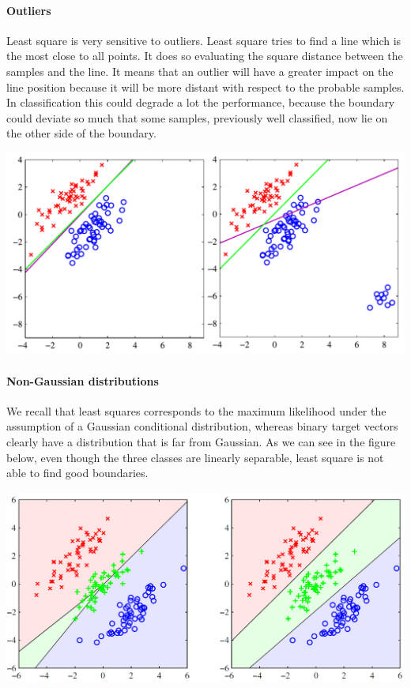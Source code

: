 \documentclass[main.tex]{subfiles}
\begin{document}
\paragraph{Outliers} Least square is very sensitive to outliers. Least square tries to find a line which is the most close to all points. It does so evaluating the square distance between the samples and the line. It means that an outlier will have a greater impact on the line position because it will be more distant with respect to the probable samples. In classification this could degrade a lot the performance, because the boundary could deviate so much that some samples, previously well classified, now lie on the other side of the boundary.
\begin{center}
    \includegraphics[scale=0.50]{img/LS_Outliers.PNG}
\end{center}

\paragraph{Non-Gaussian distributions}
We recall that least squares corresponds to the maximum likelihood under the assumption of a Gaussian conditional distribution, whereas binary target vectors clearly have a distribution that is far from Gaussian. As we can see in the figure below, even though the three classes are linearly separable, least square is not able to find good boundaries.
\begin{center}
    \includegraphics[scale=0.40]{img/LS_nongaussian.PNG}
\end{center}
\end{document}
